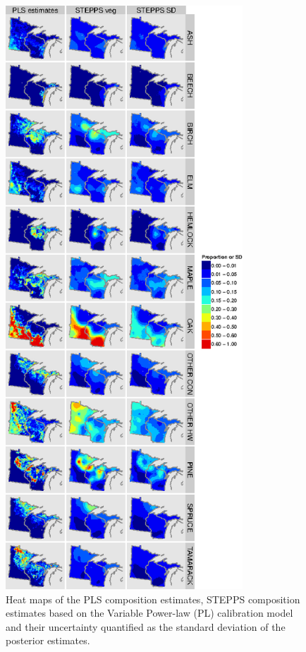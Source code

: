 \begin{figure}
\centering
\includegraphics[width=3.5in]{figures/maps_PLS_STEPPS_SD.png}
\caption{Heat maps of the PLS composition estimates, STEPPS
  composition estimates based on the Variable Power-law (PL)
  calibration model and their uncertainty quantified as the standard
  deviation of the posterior estimates.}
\label{fig:maps_pls_stepps_sd}
\end{figure}

